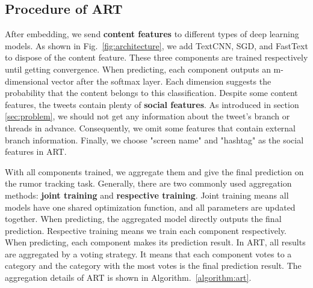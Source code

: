 \subsection{Procedure of ART}
After embedding, we send \textbf{content features} to different types of deep learning models. As shown in Fig.~\ref{fig:architecture}, we add TextCNN, SGD, and FastText to dispose of the content feature. These three components are trained respectively until getting convergence. When predicting, each component outputs an m-dimensional vector after the softmax layer. Each dimension suggests the probability that the content belongs to this classification. Despite some content features, the tweets contain plenty of \textbf{social features}. As introduced in section \ref{sec:problem}, we should not get any information about the tweet's branch or threads in advance. Consequently, we omit some features that contain external branch information. Finally, we choose "screen name" and "hashtag" as the social features in ART. 

With all components trained, we aggregate them and give the final prediction on the rumor tracking task. Generally, there are two commonly used aggregation methods: \textbf{joint training} and \textbf{respective training}. Joint training means all models have one shared optimization function, and all parameters are updated together. When predicting, the aggregated model directly outputs the final prediction. Respective training means we train each component respectively. When predicting, each component makes its prediction result. In ART, all results are aggregated by a voting strategy. It means that each component votes to a category and the category with the most votes is the final prediction result. The aggregation details of ART is shown in Algorithm.~\ref{algorithm:art}.

